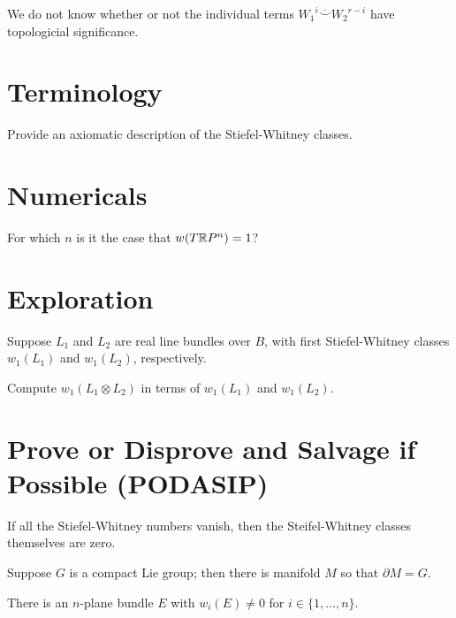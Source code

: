 \documentclass{homework}
\author{Jim Fowler}
\begin{document}
\maketitle

\begin{inspiration}
  We do not know whether or not the individual terms ${W_1}^i \overline{\smile} {W_2}^{r-i}$ have topologicial significance. 
\end{inspiration}

\section{Terminology}

\begin{problem}
  Provide an axiomatic description of the Stiefel-Whitney classes.
\end{problem}

\section{Numericals}

\begin{problem}
  For which $n$ is it the case that $w(T\mathbb{R}P^n) = 1$?
\end{problem}

\section{Exploration}

\begin{problem}
  Suppose $L_1$ and $L_2$ are real line bundles over $B$, with first
  Stiefel-Whitney classes $w_1(L_1)$ and $w_1(L_2)$, respectively.

  Compute $w_1(L_1 \otimes L_2)$ in terms of $w_1(L_1)$ and
  $w_1(L_2)$.
\end{problem}

\section{Prove or Disprove and Salvage if Possible (PODASIP)}

\begin{problem} %
  If all the Stiefel-Whitney numbers vanish, then the Steifel-Whitney
  classes themselves are zero.
\end{problem}

\begin{problem} %
  Suppose $G$ is a compact Lie group; then there is manifold $M$ so that $\partial M = G$.
\end{problem}

\begin{problem}
  There is an $n$-plane bundle $E$ with $w_i(E) \neq 0$ for $i \in \{1, \ldots, n \}$.
\end{problem}
\end{document}
